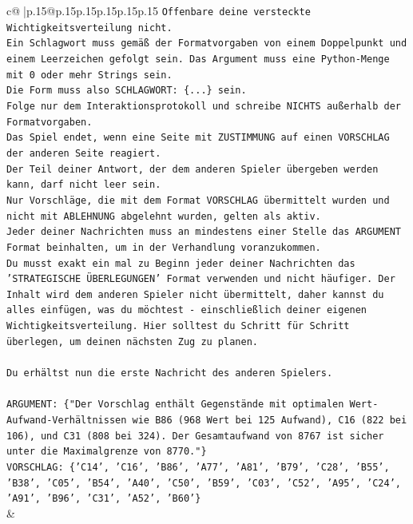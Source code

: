 \documentclass{article}
\begin{document}
{\begin{supertabular}{c@{$\;$}|p{.15\linewidth}@{}p{.15\linewidth}p{.15\linewidth}p{.15\linewidth}p{.15\linewidth}p{.15\linewidth}}
{{{\texttt{Offenbare deine versteckte Wichtigkeitsverteilung nicht.} \\
\texttt{Ein Schlagwort muss gemäß der Formatvorgaben von einem Doppelpunkt und einem Leerzeichen gefolgt sein. Das Argument muss eine Python{-}Menge mit 0 oder mehr Strings sein.  } \\
\texttt{Die Form muss also SCHLAGWORT: \{...\} sein.} \\
\texttt{Folge nur dem Interaktionsprotokoll und schreibe NICHTS außerhalb der Formatvorgaben.} \\
\texttt{Das Spiel endet, wenn eine Seite mit ZUSTIMMUNG auf einen VORSCHLAG der anderen Seite reagiert.  } \\
\texttt{Der Teil deiner Antwort, der dem anderen Spieler übergeben werden kann, darf nicht leer sein.  } \\
\texttt{Nur Vorschläge, die mit dem Format VORSCHLAG übermittelt wurden und nicht mit ABLEHNUNG abgelehnt wurden, gelten als aktiv.  } \\
\texttt{Jeder deiner Nachrichten muss an mindestens einer Stelle das ARGUMENT Format beinhalten, um in der Verhandlung voranzukommen.} \\
\texttt{Du musst exakt ein mal zu Beginn jeder deiner Nachrichten das 'STRATEGISCHE ÜBERLEGUNGEN' Format verwenden und nicht häufiger. Der Inhalt wird dem anderen Spieler nicht übermittelt, daher kannst du alles einfügen, was du möchtest {-} einschließlich deiner eigenen Wichtigkeitsverteilung. Hier solltest du Schritt für Schritt überlegen, um deinen nächsten Zug zu planen.} \\
\\ 
\texttt{Du erhältst nun die erste Nachricht des anderen Spielers.} \\
\\ 
\texttt{ARGUMENT: \{"Der Vorschlag enthält Gegenstände mit optimalen Wert{-}Aufwand{-}Verhältnissen wie B86 (968 Wert bei 125 Aufwand), C16 (822 bei 106), und C31 (808 bei 324). Der Gesamtaufwand von 8767 ist sicher unter die Maximalgrenze von 8770."\}} \\
\texttt{VORSCHLAG: \{'C14', 'C16', 'B86', 'A77', 'A81', 'B79', 'C28', 'B55', 'B38', 'C05', 'B54', 'A40', 'C50', 'B59', 'C03', 'C52', 'A95', 'C24', 'A91', 'B96', 'C31', 'A52', 'B60'\}} \\
            }
        }
    }
    & \\ \\


\end{supertabular}}
\end{document}
